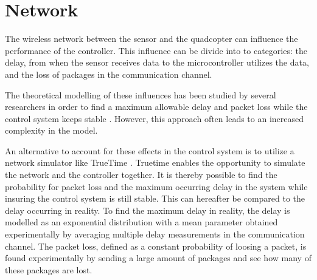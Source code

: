 \section{Network}
The wireless network between the sensor and the quadcopter can influence the performance of the controller. This influence can be divide into to categories: the delay, from when the sensor receives data to the microcontroller utilizes the data, and the loss of packages in the communication channel.



The theoretical modelling of these influences has been studied by several researchers in order to find a maximum allowable delay and packet loss while the control system keeps stable . However, this approach often leads to an increased complexity in the model. 

An alternative to account for these effects in the control system is to utilize a network simulator like TrueTime \cite{TrueTime}. Truetime enables the opportunity to simulate the network and the controller together. It is thereby possible to find the probability for packet loss and the maximum occurring delay in the system while insuring the control system is still stable. This can hereafter be compared to the delay occurring in reality. To find the maximum delay in reality, the delay is modelled as an exponential distribution with a mean parameter obtained experimentally by averaging multiple delay measurements in the communication channel. The packet loss, defined as a constant probability of loosing a packet, is found experimentally by sending a large amount of packages and see how many of these packages are lost.  

